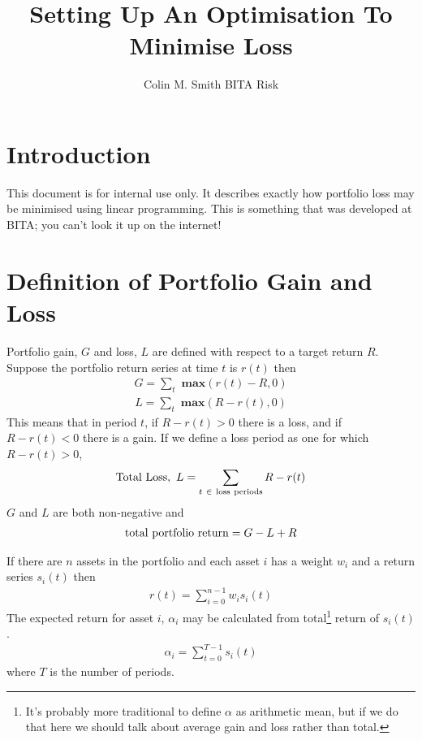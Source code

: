\documentclass[12pt]{article}
\title{Setting Up An Optimisation To Minimise Loss}
\author{Colin M. Smith BITA Risk}
\begin{document}
\maketitle
\tableofcontents
\pagebreak
\doublespacing
\section{Introduction}
This document is for internal use only. It describes exactly how portfolio loss may be minimised
using linear programming. This is something that was developed at BITA; you can't look it up on the internet!
\section{Definition of Portfolio Gain and Loss}
Portfolio gain, $G$ and loss, $L$ are defined with respect to a target return $R$. Suppose the portfolio return
series at time $t$ is $r(t)$ then
\begin{eqnarray}
    G = \sum_t {\textbf{ max} }(r(t) - R,0)
\end{eqnarray}
\begin{eqnarray}
    L = \sum_t {\textbf{ max} }(R-r(t),0)
\end{eqnarray}
This means that in period $t$, if $R-r(t) > 0$ there is a loss, and if $R-r(t) < 0$ there is a gain.
If we define a loss period as one for which $R-r(t) > 0$,
\begin{eqnarray}
  {\rm Total\ Loss},\ L= \sum_{t\ \in\ \rm loss\ periods} R-r(t)
\end{eqnarray}
$G$ and $L$ are both non-negative and
\begin{eqnarray}
 {\rm   total\ portfolio\ return}= G - L + R
\end{eqnarray}

If there are $n$ assets in the portfolio and each asset $i$
has a weight $w_i$ and a return series $s_i (t)$ then
\begin{eqnarray}
    r(t) = \sum_{i=0}^{n-1} w_i s_i(t)
\end{eqnarray}
The expected return for asset $i$, $\alpha_i$ may be calculated from total\footnote{It's probably more traditional to define $\alpha$ as arithmetic mean, but if we do that here we should talk about average gain and loss rather than total.} 
return of $s_i(t)$.
\begin{eqnarray}
    \alpha_i =  \sum_{t=0}^{T-1} s_i(t)
\end{eqnarray}
where $T$ is the number of periods.
\end{document}
